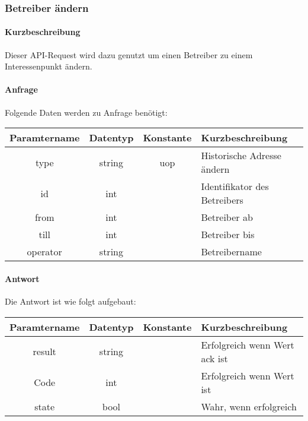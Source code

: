 \subsubsection{Betreiber ändern}
\paragraph{Kurzbeschreibung}Dieser API-Request wird dazu genutzt um einen Betreiber zu einem Interessenpunkt ändern.
\paragraph{Anfrage}Folgende Daten werden zu Anfrage benötigt:
\begin{table}[H]
	\begin{tabular}{|c|c|c|p{6.5cm}|}
		\hline
		\textbf{Paramtername} & \textbf{Datentyp} & \textbf{Konstante} & \textbf{Kurzbeschreibung}                                                                                               \\ \hline
		type                & string            & uop                & Historische Adresse ändern \\ \hline
		id                  & int               &                    & Identifikator des Betreibers \\ \hline
		from                & int               &                    & Betreiber ab \\ \hline
		till                & int               &                    & Betreiber bis \\ \hline
		operator            & string            &                    & Betreibername \\ \hline
	\end{tabular}
\end{table}
\paragraph{Antwort}Die Antwort ist wie folgt aufgebaut:
\begin{table}[H]
	\begin{tabular}{|c|c|c|p{6.5cm}|}
		\hline
		\textbf{Paramtername} & \textbf{Datentyp} & \textbf{Konstante} & \textbf{Kurzbeschreibung}                                                                                               \\ \hline
		result              & string           &                 & Erfolgreich wenn Wert {\glqq ack\grqq} ist \\ \hline
		Code                & int              &                 & Erfolgreich wenn Wert {\glqq 0\grqq} ist \\ \hline
		state               & bool             &                 & Wahr, wenn erfolgreich \\ \hline
	\end{tabular}
\end{table}
